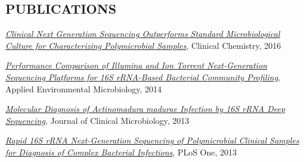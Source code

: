 \documentclass{res}
\begin{document}
\begin{resume}
\section{PUBLICATIONS}
\renewcommand{\section}[2]{}
\begin{thebibliography}{4}
    \href{http://clinchem.aaccjnls.org/content/62/11/1465}
         {\textit{Clinical Next Generation Sequencing Outperforms Standard 
                  Microbiological Culture for Characterizing 
                  Polymicrobial Samples}},
         Clinical Chemistry, 2016

    \href{http://aem.asm.org/content/80/24/7583}
         {\textit{Performance Comparison of Illumina and Ion Torrent 
                  Next-Generation Sequencing Platforms for 16S rRNA-Based 
                  Bacterial Community Profiling}},
         Applied Environmental Microbiology, 2014

    \href{http://jcm.asm.org/content/51/12/4262}
         {\textit{Molecular Diagnosis of Actinomadura madurae 
                  Infection by 16S rRNA Deep Sequencing}},
         Journal of Clinical Microbiology, 2013

    \href{http://journals.plos.org/plosone/article?id=10.1371/journal.pone.0065226}
         {\textit{Rapid 16S rRNA Next-Generation Sequencing of Polymicrobial 
                  Clinical Samples for Diagnosis of Complex Bacterial Infections}},
         PLoS One, 2013
\end{thebibliography}
\nocite{*}

\end{resume}
\end{document}
